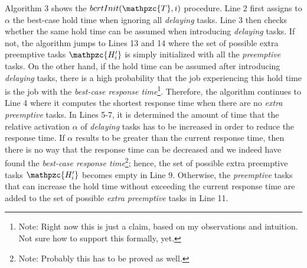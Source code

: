 \documentclass[fleqn]{article}
\begin{document}
Algorithm 3 shows the $bcrtInit(\mathpzc{T},i)$ procedure. Line 2 first assigns to $\alpha$ the  best-case hold time when ignoring all \textit{delaying} tasks. Line 3 then checks whether the same hold time can be assumed when introducing \textit{delaying} tasks. If not, the algorithm jumps to Lines 13 and 14 where the set of possible extra preemptive tasks $\mathpzc{H^{\prime}_i}$ is simply initialized with all the \textit{preemptive} tasks. On the other hand, if the hold time can be assumed after introducing \textit{delaying} tasks, there is a high probability that the job experiencing this hold time is the job with the \textit{best-case response time}\footnote{Note: Right now this is just a claim, based on my observations and intuition. Not sure how to support this formally, yet.}. Therefore, the algorithm continues to Line 4 where it computes the shortest response time when there are no \textit{extra preemptive} tasks. In Lines 5-7, it is determined the amount of time that the relative activation $\alpha$ of \textit{delaying} tasks has to be increased in order to reduce the response time. If $\alpha$ results to be greater than the current response time, then there is no way that the response time can be decreased and we indeed have found the \textit{best-case response time}\footnote{Note: Probably this has to be proved as well.}; hence, the set of possible extra preemptive tasks $\mathpzc{H^{\prime}_i}$ becomes empty in Line 9. Otherwise, the \textit{preemptive} tasks that can increase the hold time without exceeding the current response time are added to the set of possible\textit{ extra preemptive} tasks in Line 11.

\end{document}
